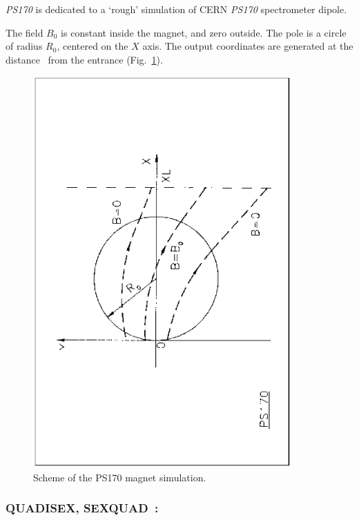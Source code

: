 \textsl{PS170} is dedicated to a `rough' simulation
of CERN \textsl{PS170} spectrometer dipole.  
\medskip

\noindent The field $ B_0 $ is constant inside the magnet, and zero outside. 
The pole is a circle  of radius $ R_0 $, centered on the $ X $ axis.  The output coordinates are
generated at the distance \XL\ from the entrance (Fig.~\ref{fig25}).  %
\vfill

\begin{figure}[H]
\centerline{\includegraphics[height=15cm,angle=-90]{Fig25.ps}}
\caption{\label{fig25}Scheme of the PS170 magnet simulation.}
\end{figure}

\vfill

\newpage

\subsubsection*{QUADISEX, SEXQUAD~: \QUADISEXTitl} \label{QUADISEX}\label{SEXQUAD}
\medskip 
{} 

